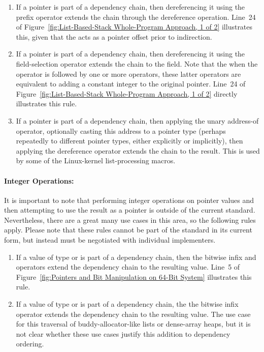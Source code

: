 \documentclass[letterpaper,twocolumn,10pt]{article}
\begin{document}
\begin{enumerate}
\item	If a pointer is part of a dependency chain, then dereferencing it
	using the prefix \co{*} operator extends the chain through
	the dereference operation.
	Line~24 of
	Figure~\ref{fig:List-Based-Stack Whole-Program Approach, 1 of 2}
	illustrates this, given that the  acts as a pointer offset
	prior to indirection.
\item	If a pointer is part of a dependency chain, then dereferencing it
	using the \co{->} field-selection operator extends the
	chain to the field.
	Note that the when the \co{->} operator is followed by one or more
	 operators, these latter operators are equivalent to adding
	a constant integer to the original pointer.
	Line~24 of
	Figure~\ref{fig:List-Based-Stack Whole-Program Approach, 1 of 2}
	directly illustrates this rule.
\item	If a pointer is part of a dependency chain, then applying the
	unary \co{&} address-of operator, optionally casting this
	address to a pointer type (perhaps repeatedly to different pointer
	types, either explicitly or implicitly), then applying the
	\co{*} dereference operator extends the chain to the result.
	This is used by some of the Linux-kernel list-processing macros.
\end{enumerate}

\paragraph{Integer Operations:}

It is important to note that performing integer operations on pointer
values and then attempting to use the result as a pointer is outside
of the current standard.
Nevertheless, there are a great many use cases in this area, so
the following rules apply.
Please note that these rules cannot be part of the standard in its
current form, but instead must be negotiated with individual
implementers.

\begin{enumerate}
\item	If a value of type  or  is part of a
	dependency chain, then the bitwise infix \co{&} and \co{|}
	operators extend the dependency chain to the resulting value.
	Line~5 of
	Figure~\ref{fig:Pointers and Bit Manipulation on 64-Bit System}
	illustrates this rule.
\item	If a value of type  or  is part of a
	dependency chain, the the bitwise infix \co{^} operator extends
	the dependency chain to the resulting value.
	The use case for this traversal of buddy-allocator-like lists
	or dense-array heaps, but it is not clear whether these use
	cases justify this addition to dependency ordering.
\end{enumerate}
\end{document}
